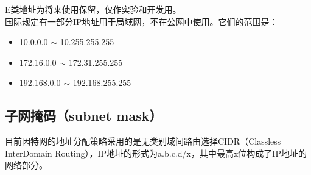 E类地址为将来使用保留，仅作实验和开发用。\\

国际规定有一部分IP地址用于局域网，不在公网中使用。它们的范围是：

\begin{itemize}
    \item 10.0.0.0 $ \sim $ 10.255.255.255
    \item 172.16.0.0 $ \sim $ 172.31.255.255
    \item 192.168.0.0 $ \sim $ 192.168.255.255
\end{itemize}

\vspace{0.5cm}

\subsection{子网掩码（subnet mask）}

目前因特网的地址分配策略采用的是无类别域间路由选择CIDR（Classless InterDomain Routing），IP地址的形式为a.b.c.d/x，其中最高x位构成了IP地址的网络部分。\\

